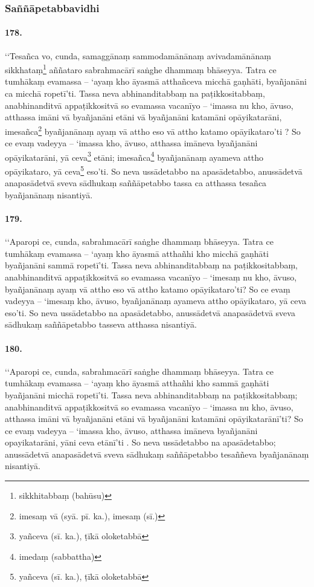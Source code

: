 \subsubsection{Saññāpetabbavidhi}

\paragraph{178.} ‘‘Tesañca vo, cunda, samaggānaṃ sammodamānānaṃ avivadamānānaṃ sikkhataṃ\footnote{sikkhitabbaṃ (bahūsu)} aññataro sabrahmacārī saṅghe dhammaṃ bhāseyya. Tatra ce tumhākaṃ evamassa – ‘ayaṃ kho āyasmā atthañceva micchā gaṇhāti, byañjanāni ca micchā ropetī’ti. Tassa neva abhinanditabbaṃ na paṭikkositabbaṃ, anabhinanditvā appaṭikkositvā so evamassa vacanīyo – ‘imassa nu kho, āvuso, atthassa imāni vā byañjanāni etāni vā byañjanāni katamāni opāyikatarāni, imesañca\footnote{imesaṃ vā (syā. pī. ka.), imesaṃ (sī.)} byañjanānaṃ ayaṃ vā attho eso vā attho katamo opāyikataro’ti ? So ce evaṃ vadeyya – ‘imassa kho, āvuso, atthassa imāneva byañjanāni opāyikatarāni, yā ceva\footnote{yañceva (sī. ka.), ṭīkā oloketabbā} etāni; imesañca\footnote{imedaṃ (sabbattha)} byañjanānaṃ ayameva attho opāyikataro, yā ceva\footnote{yañceva (sī. ka.), ṭīkā oloketabbā} eso’ti. So neva ussādetabbo na apasādetabbo, anussādetvā anapasādetvā sveva sādhukaṃ saññāpetabbo tassa ca atthassa tesañca byañjanānaṃ nisantiyā.

\paragraph{179.} ‘‘Aparopi ce, cunda, sabrahmacārī saṅghe dhammaṃ bhāseyya. Tatra ce tumhākaṃ evamassa – ‘ayaṃ kho āyasmā atthañhi kho micchā gaṇhāti byañjanāni sammā ropetī’ti. Tassa neva abhinanditabbaṃ na paṭikkositabbaṃ, anabhinanditvā appaṭikkositvā so evamassa vacanīyo – ‘imesaṃ nu kho, āvuso, byañjanānaṃ ayaṃ vā attho eso vā attho katamo opāyikataro’ti? So ce evaṃ vadeyya – ‘imesaṃ kho, āvuso, byañjanānaṃ ayameva attho opāyikataro, yā ceva eso’ti. So neva ussādetabbo na apasādetabbo, anussādetvā anapasādetvā sveva sādhukaṃ saññāpetabbo tasseva atthassa nisantiyā.

\paragraph{180.} ‘‘Aparopi ce, cunda, sabrahmacārī saṅghe dhammaṃ bhāseyya. Tatra ce tumhākaṃ evamassa – ‘ayaṃ kho āyasmā atthañhi kho sammā gaṇhāti byañjanāni micchā ropetī’ti. Tassa neva abhinanditabbaṃ na paṭikkositabbaṃ; anabhinanditvā appaṭikkositvā so evamassa vacanīyo – ‘imassa nu kho, āvuso, atthassa imāni vā byañjanāni etāni vā byañjanāni katamāni opāyikatarānī’ti? So ce evaṃ vadeyya – ‘imassa kho, āvuso, atthassa imāneva byañjanāni opayikatarāni, yāni ceva etānī’ti . So neva ussādetabbo na apasādetabbo; anussādetvā anapasādetvā sveva sādhukaṃ saññāpetabbo tesaññeva byañjanānaṃ nisantiyā.

